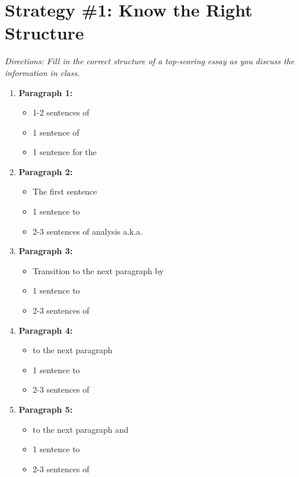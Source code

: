 \section{Strategy \#1: Know the Right Structure}

\textit{Directions: Fill in the correct structure of a top-scoring essay as you discuss the information in class.}

\begin{enumerate}
\item \textbf{Paragraph 1:} \hrulefill

\begin{itemize}
\item 1-2 sentences of \hrulefill
\item 1 sentence of \hrulefill
\item 1 sentence for the \hrulefill
\end{itemize}

\item \textbf{Paragraph 2:} \hrulefill

\begin{itemize}
\item The first sentence \hrulefill
\item 1 sentence to \hrulefill
\item 2-3 sentences of analysis a.k.a. \hrulefill
\end{itemize}

\item \textbf{Paragraph 3:} \hrulefill

\begin{itemize}
\item Transition to the next paragraph by \hrulefill
\item 1 sentence to \hrulefill
\item 2-3 sentences of \hrulefill
\end{itemize}

\item \textbf{Paragraph 4:} \hrulefill

\begin{itemize}
\item \underline{\hspace{2in}} to the next paragraph 
\item 1 sentence to \hrulefill
\item 2-3 sentences of \hrulefill
\end{itemize}

\item \textbf{Paragraph 5:} \hrulefill

\begin{itemize}
\item \underline{\hspace{2in}} to the next paragraph and \hrulefill
\item 1 sentence to \hrulefill
\item 2-3 sentences of \hrulefill
\end{itemize}
\end{enumerate}